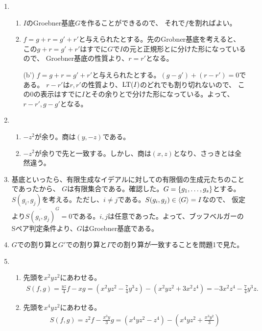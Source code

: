 \documentclass[9pt]{ltjsarticle}
\begin{document}
\begin{enumerate}[label=(問題 \arabic*)]
  \item
  \begin{enumerate}[label=(\alph*)]
    \item $I$のGroebner基底$G$を作ることができるので、
    それで$f$を割ればよい。
    \item $f=g+r=g'+r'$と与えられたとする。先のGrobner基底を考えると、
    この$g+r=g'+r'$はすでに$G$で$I$の元と正規形とに分けた形になっているので、
    Groebner基底の性質より、$r=r'$となる。
    \item[(b')] $f=g+r=g'+r'$と与えられたとする。$(g-g')+(r-r') = 0$である。
    $r-r'$は$r,r'$の性質より、${\rm LT}(I)$のどれでも割り切れないので、
    この$0$の表示はすでに$I$とその余りとで分けた形になっている。よって、
    $r-r',g-g'$となる。
  \end{enumerate}
  \item
  \begin{enumerate}[label=(\alph*)]
    \item
    $-z^2$が余り。商は$(y,-z)$である。
    \item
    $-z^2$が余りで先と一致する。しかし、商は$(x,z)$となり、さっきとは全然違う。
  \end{enumerate}
  \item
  基底といったら、有限生成なイデアルに対しての有限個の生成元たちのことであったから、
  $G$は有限集合である。確認した。$G=\left\{g_1,\dots,g_s\right\}$とする。
  $S(g_i,g_j)$を考える。ただし、$i\neq j$である。$S(g_i,g_j)\in \left\langle G \right\rangle = I$なので、
  仮定より$\overline{S(g_i,g_j)}^G = 0$である。$i,j$は任意であった。よって、ブッフベルガーのSペア判定条件より、$G$はGroebner基底である。
  \item
  $G$での割り算と$G'$での割り算と$I$での割り算が一致することを問題1で見た。
  \item
  \begin{enumerate}[label=(\alph*)]
    \item 先頭を$x^2yz^2$にあわせる。
    \begin{align}
      S(f,g)
      =
      \frac{yz}{4}f - xg
      =
      (x^2yz^2 - \frac{7}{4}y^3z) - (x^2yz^2 + 3x^2z^4)
      =
      -3x^2z^4 - \frac{7}{4}y^3z.
    \end{align}
    \item 先頭を$x^4yz^2$にあわせる。
    \begin{align}
      S(f,g)
      =
      z^2f - \frac{x^3y}{3}g
      =
      (x^4yz^2 - z^4) - (x^4yz^2 + \frac{x^3y^2}{3})

\end{align}
\end{enumerate}
\end{enumerate}
\end{document}
